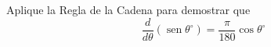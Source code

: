 \item Aplique la Regla de la Cadena para demostrar que
$$\frac{d}{d\theta} (\operatorname{sen} \theta^\circ) = \frac{\pi}{180} \cos \theta^\circ$$

